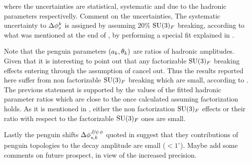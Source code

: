 \noindent where the uncertainties are statistical, systematic and due to the hadronic parameters respectivelly. 
{\color{red} Comment on the uncertainties, }
The systematic uncertainty to $\Delta\phi_{s}^{k}$ is assigned by assuming $20\%$ $\mathrm{SU}(3)_F$ breaking,
according to what was mentioned at the end of , by performing a special fit 
explained in .

Note that the penguin parameters $(a_k,\theta_k)$ are ratios of hadronic amplitudes. Given that it is
interesting to point out that any factorizable $\mathrm{SU}(3)_F$ breaking effects entering through the assumption
of  cancel out.
Thus the results reported here suffer from non factorizable $\mathrm{SU}(3)_F$ breaking which are small,
according to \cite{DeBruyn-thesis}. The previous statement is supported by the values of the fitted hadronic parameter
ratios which are close to the once calculated assuming factorization holds. As it is mentioned in \cite{DeBruyn-thesis},
either the non factorization $\mathrm{SU}(3)_F$ effects or their ratio with respect to the factorizable $\mathrm{SU}(3)_F$
ones are small.


Lastly the penguin shifts $\Delta\phi^{{J\mskip -3mu/\mskip -2mu\psi\mskip 2mu}\phi}_{s,{k}}$ quoted in 
suggest that they contributions of penguin topologies to the \BsJpsiPhi decay amplitude are small ($<1^\circ$).
{\color{red} Maybe add some comments on future prospect, in view of the increased precision.}

